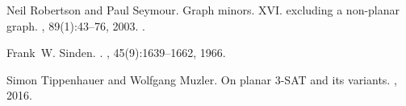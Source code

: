 \documentclass[a4paper,UKenglish,cleveref,autoref]{lipics-v2021}
\begin{document}
\begin{thebibliography}{10}
Neil Robertson and Paul Seymour.
\newblock Graph minors. {XVI.} excluding a non-planar graph.
, 89(1):43--76, 2003.
\newblock \href {https://doi.org/10.1016/S0095-8956(03)00042-X}
  {}.

Frank~W. Sinden.
.
, 45(9):1639--1662, 1966.

Simon Tippenhauer and Wolfgang Muzler.
\newblock On planar {3-SAT} and its variants.
, 2016.

\end{thebibliography}
\end{document}
